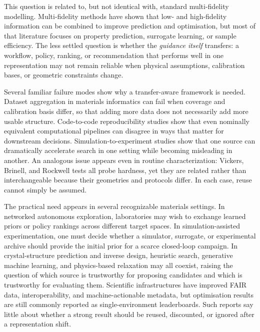 \documentclass[twoside,twocolumn,9pt]{article}
\begin{document}
This question is related to, but not identical with, standard multi-fidelity modelling. Multi-fidelity methods have shown that low- and high-fidelity information can be combined to improve prediction and optimisation,\cite{Pilania2016MultiFidelityCoKriging,Tran2020MFGP} but most of that literature focuses on property prediction, surrogate learning, or sample efficiency. The less settled question is whether the \emph{guidance itself} transfers: a workflow, policy, ranking, or recommendation that performs well in one representation may not remain reliable when physical assumptions, calibration bases, or geometric constraints change.

Several familiar failure modes show why a transfer-aware framework is needed. Dataset aggregation in materials informatics can fail when coverage and calibration basis differ, so that adding more data does not necessarily add more usable structure.\cite{Ottomano2024DataAggregation} Code-to-code reproducibility studies show that even nominally equivalent computational pipelines can disagree in ways that matter for downstream decisions.\cite{Lejaeghere2016Reproducibility} Simulation-to-experiment studies show that one source can dramatically accelerate search in one setting while becoming misleading in another.\cite{Gongora2021SimulationTransfer} An analogous issue appears even in routine characterization: Vickers, Brinell, and Rockwell tests all probe hardness, yet they are related rather than interchangeable because their geometries and protocols differ.\cite{Broitman2017HardnessOverview} In each case, reuse cannot simply be assumed.

The practical need appears in several recognizable materials settings. In networked autonomous exploration, laboratories may wish to exchange learned priors or policy rankings across different target spaces.\cite{Yoshida2025NetworkedAutonomous} In simulation-assisted experimentation, one must decide whether a simulator, surrogate, or experimental archive should provide the initial prior for a scarce closed-loop campaign.\cite{Gongora2021SimulationTransfer} In crystal-structure prediction and inverse design, heuristic search, generative machine learning, and physics-based relaxation may all coexist, raising the question of which source is trustworthy for proposing candidates and which is trustworthy for evaluating them.\cite{Collins2025FUSE} Scientific infrastructures have improved FAIR data, interoperability, and machine-actionable metadata,\cite{Wilkinson2016FAIR,Andersen2021OPTIMADE,Ghiringhelli2023SharedMetadata} but optimisation results are still commonly reported as single-environment leaderboards. Such reports say little about whether a strong result should be reused, discounted, or ignored after a representation shift.
\end{document}
